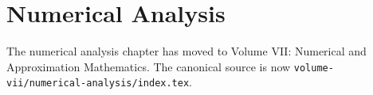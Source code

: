 \chapter{Numerical Analysis}

\begin{remark*}
The numerical analysis chapter has moved to Volume VII: Numerical and
Approximation Mathematics. The canonical source is now
\texttt{volume-vii/numerical-analysis/index.tex}.
\end{remark*}
